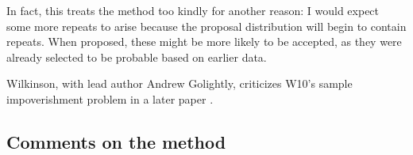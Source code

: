 \documentclass{article}
\begin{document}
In fact, this treats the method too kindly for another reason: I would expect some more repeats to arise because the proposal distribution will begin to contain repeats. When proposed, these might be more likely to be accepted, as they were already selected to be probable based on earlier data. 

Wilkinson, with lead author Andrew Golightly, criticizes W10's sample impoverishment problem in a later paper \cite{golightly2011bayesian}. 



\subsection{Comments on the method}
\end{document}
